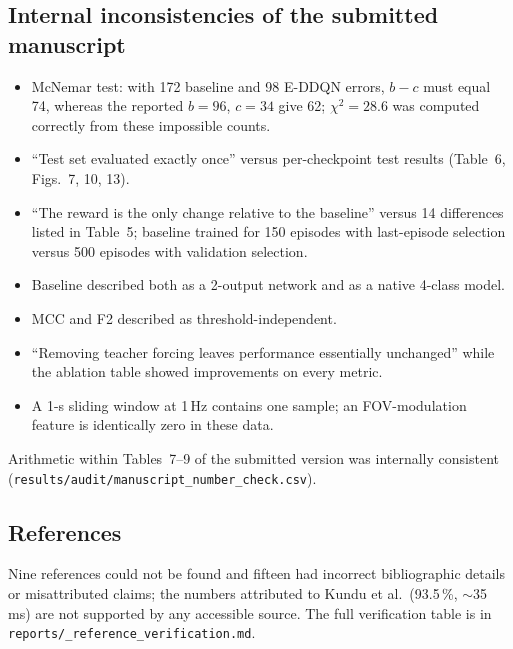 \subsection{Internal inconsistencies of the submitted manuscript}
\begin{itemize}
\item McNemar test: with 172 baseline and 98 E-DDQN errors, $b-c$ must equal 74, whereas the reported $b=96$, $c=34$ give 62; $\chi^2=28.6$ was computed correctly from these impossible counts.
\item ``Test set evaluated exactly once'' versus per-checkpoint test results (Table~6, Figs.~7, 10, 13).
\item ``The reward is the only change relative to the baseline'' versus 14 differences listed in Table~5; baseline trained for 150 episodes with last-episode selection versus 500 episodes with validation selection.
\item Baseline described both as a 2-output network and as a native 4-class model.
\item MCC and F2 described as threshold-independent.
\item ``Removing teacher forcing leaves performance essentially unchanged'' while the ablation table showed improvements on every metric.
\item A 1-s sliding window at 1\,Hz contains one sample; an FOV-modulation feature is identically zero in these data.
\end{itemize}
Arithmetic within Tables~7--9 of the submitted version was internally consistent (\texttt{results/\allowbreak audit/\allowbreak manuscript\_number\_check.csv}).

\subsection{References}
Nine references could not be found and fifteen had incorrect bibliographic details or misattributed claims; the numbers attributed to Kundu et al.\ (93.5\,\%, $\sim$35\,ms) are not supported by any accessible source. The full verification table is in \texttt{reports/\_reference\_verification.md}.
